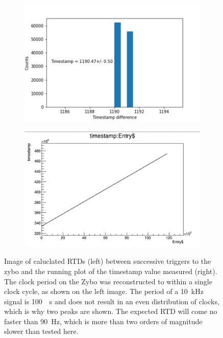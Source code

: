 \begin{figure}[]
\centering
\begin{subfigure}{.5\textwidth}
  \centering
  \includegraphics[width=\textwidth]{images/zybo_10khz_timestamp_frequency_calibration.png}
  \caption{}
\end{subfigure}%
\begin{subfigure}{.5\textwidth}
  \centering
  \includegraphics[width=\textwidth]{images/zybo_10khz_timestamp_graph.png}
  \caption{}
\end{subfigure}
\caption{Image of caluclated RTDs (left) between successive triggers to the zybo and the running plot of the timestamp value measured (right).
The clock period on the Zybo was reconstructed to within a single clock cycle, as shown on the left image.
The period of a 10~\unit{kHz} signal is 100~\unit{\mu s} and does not result in an even distribution of clocks, which is why two peaks are shown.
The expected RTD will come no faster than 90~\unit{Hz}, which is more than two orders of magnitude slower than tested here.
}
\label{fig:frequency_reconstruction}
\end{figure}

